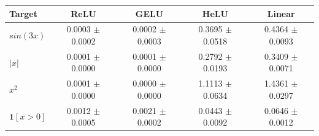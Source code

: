 \begin{tabular}{lcccc}
\toprule
Target & ReLU & GELU & HeLU & Linear \\
\midrule
$sin(3x)$ & 0.0003 $\pm$ 0.0002 & 0.0002 $\pm$ 0.0003 & 0.3695 $\pm$ 0.0518 & 0.4364 $\pm$ 0.0093 \\
$|x|$ & 0.0001 $\pm$ 0.0000 & 0.0001 $\pm$ 0.0000 & 0.2792 $\pm$ 0.0193 & 0.3409 $\pm$ 0.0071 \\
$x^2$ & 0.0001 $\pm$ 0.0000 & 0.0000 $\pm$ 0.0000 & 1.1113 $\pm$ 0.0634 & 1.4361 $\pm$ 0.0297 \\
$\mathbf{1}[x>0]$ & 0.0012 $\pm$ 0.0005 & 0.0021 $\pm$ 0.0002 & 0.0443 $\pm$ 0.0092 & 0.0646 $\pm$ 0.0012 \\
\bottomrule
\end{tabular}
